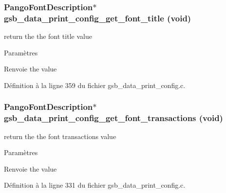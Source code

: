 \subsubsection[{gsb\_\-data\_\-print\_\-config\_\-get\_\-font\_\-title}]{\setlength{\rightskip}{0pt plus 5cm}PangoFontDescription$\ast$ gsb\_\-data\_\-print\_\-config\_\-get\_\-font\_\-title (void)}\label{gsb__data__print__config_8c_a683c317369e1e940e1066cccd3306099}
return the the font title value


\begin{DoxyParams}{Paramètres}
\item[{\em }]\end{DoxyParams}
\begin{DoxyReturn}{Renvoie}
the value 
\end{DoxyReturn}


Définition à la ligne 359 du fichier gsb\_\-data\_\-print\_\-config.c.

\subsubsection[{gsb\_\-data\_\-print\_\-config\_\-get\_\-font\_\-transactions}]{\setlength{\rightskip}{0pt plus 5cm}PangoFontDescription$\ast$ gsb\_\-data\_\-print\_\-config\_\-get\_\-font\_\-transactions (void)}\label{gsb__data__print__config_8c_af32e6fae377170c98443900214ddd009}
return the the font transactions value


\begin{DoxyParams}{Paramètres}
\item[{\em }]\end{DoxyParams}
\begin{DoxyReturn}{Renvoie}
the value 
\end{DoxyReturn}


Définition à la ligne 331 du fichier gsb\_\-data\_\-print\_\-config.c.

